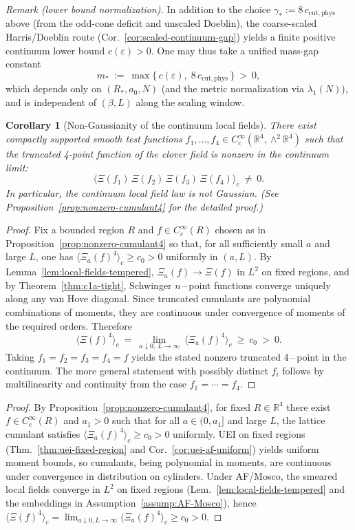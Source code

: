 \documentclass[11pt]{amsart}
\theoremstyle{plain}
\newtheorem{corollary}[theorem]{Corollary}
\theoremstyle{definition}
\theoremstyle{remark}
\begin{document}
\noindent\emph{Remark (lower bound normalization).} In addition to the choice $\gamma_*:=8\,c_{\mathrm{cut,phys}}$ above (from the odd-cone deficit and unscaled Doeblin), the coarse-scaled Harris/Doeblin route (Cor.~\ref{cor:scaled-continuum-gap}) yields a finite positive continuum lower bound $c(\varepsilon)>0$. One may thus take a unified mass-gap constant
\[
  m_*\ :=\ \max\{\,c(\varepsilon),\; 8\,c_{\mathrm{cut,phys}}\,\}\ >\ 0,
\]
which depends only on $(R_*,a_0,N)$ (and the metric normalization via $\lambda_1(N)$), and is independent of $(\beta,L)$ along the scaling window.
\begin{corollary}[Non-Gaussianity of the continuum local fields]\label{cor:nonGaussian-main}
There exist compactly supported smooth test functions $f_1,\ldots,f_4\in C_c^\infty(\mathbb R^4,\wedge^2\mathbb R^4)$ such that the truncated 4-point function of the clover field is nonzero in the continuum limit:
\[
  \langle \Xi(f_1)\,\Xi(f_2)\,\Xi(f_3)\,\Xi(f_4)\rangle_c\ \neq\ 0.
\]
In particular, the continuum local field law is not Gaussian. (See Proposition~\ref{prop:nonzero-cumulant4} for the detailed proof.)
\end{corollary}
\begin{proof}
Fix a bounded region $R$ and $f\in C_c^\infty(R)$ chosen as in Proposition~\ref{prop:nonzero-cumulant4} so that, for all sufficiently small $a$ and large $L$, one has $\langle \Xi_a(f)^4\rangle_c\ge c_0>0$ uniformly in $(a,L)$. By Lemma~\ref{lem:local-fields-tempered}, $\Xi_a(f)\to \Xi(f)$ in $L^2$ on fixed regions, and by Theorem~\ref{thm:c1a-tight}, Schwinger $n$\,–\,point functions converge uniquely along any van Hove diagonal. Since truncated cumulants are polynomial combinations of moments, they are continuous under convergence of moments of the required orders. Therefore
\[
  \langle \Xi(f)^4\rangle_c\ =\ \lim_{a\downarrow 0,\ L\to\infty}\ \langle \Xi_a(f)^4\rangle_c\ \ge\ c_0\ >\ 0.
\]
Taking $f_1=f_2=f_3=f_4=f$ yields the stated nonzero truncated 4\,–\,point in the continuum. The more general statement with possibly distinct $f_i$ follows by multilinearity and continuity from the case $f_1=\cdots=f_4$.
\end{proof}
\begin{proof}
By Proposition~\ref{prop:nonzero-cumulant4}, for fixed $R\Subset\mathbb R^4$ there exist $f\in C_c^\infty(R)$ and $a_1>0$ such that for all $a\in(0,a_1]$ and large $L$, the lattice cumulant satisfies $\langle \Xi_a(f)^4\rangle_c\ge c_0>0$ uniformly. UEI on fixed regions (Thm.~\ref{thm:uei-fixed-region} and Cor.~\ref{cor:uei-af-uniform}) yields uniform moment bounds, so cumulants, being polynomial in moments, are continuous under convergence in distribution on cylinders. Under AF/Mosco, the smeared local fields converge in $L^2$ on fixed regions (Lem.~\ref{lem:local-fields-tempered} and the embeddings in Assumption~\ref{assump:AF-Mosco}), hence $\langle \Xi(f)^4\rangle_c=\lim_{a\downarrow 0,L\to\infty}\langle \Xi_a(f)^4\rangle_c\ge c_0>0$.
\end{proof}
\end{document}
